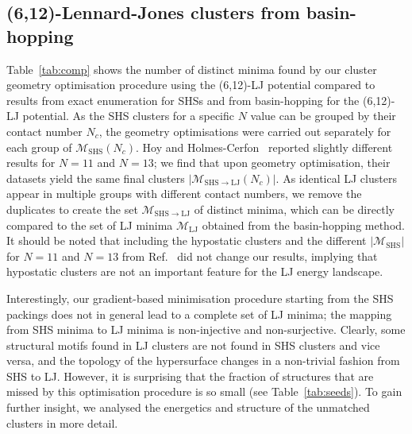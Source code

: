 \subsection{(6,12)-Lennard-Jones clusters from basin-hopping} 

Table~\ref{tab:comp} shows the number of distinct minima found by our cluster
geometry optimisation procedure using the (6,12)-LJ potential compared to
results from exact enumeration for SHSs and from basin-hopping for the (6,12)-LJ
potential.  As the SHS clusters for a specific $N$ value can be grouped by
their contact number $N_c$, the geometry optimisations were carried out
separately for each group of $\mathcal{M}_\mathrm{SHS}(N_c)$. Hoy
\autocite{Hoy_Structurefinitesphere_2012,Hoy_Structuredynamicsmodel_2015} and Holmes-Cerfon~\autocite{Holmes-Cerfon_EnumeratingRigidSphere_2016}  reported
slightly different results
for $N=11$ and $N=13$; we find that upon geometry optimisation,
their datasets yield the same final clusters
$|\mathcal{M}_{\mathrm{SHS\to LJ}}(N_c)|$.  As identical LJ clusters appear in
multiple groups with different contact numbers, we remove the duplicates to
create the set $\mathcal{M}_\mathrm{SHS\to LJ}$ of distinct minima, which can
be directly compared to the set of LJ minima $\mathcal{M}_\mathrm{LJ}$ obtained
from the basin-hopping method. It should be noted that including the hypostatic
clusters and the different $|\mathcal{M}_\mathrm{SHS}|$ for $N=11$ and $N=13$
from Ref.~\autocite{Holmes-Cerfon_EnumeratingRigidSphere_2016} did not change our results, implying that hypostatic
clusters are not an important feature for the LJ energy landscape. 


Interestingly, our gradient-based minimisation procedure starting from the SHS
packings does not in general lead to a complete set of LJ minima; the mapping
from SHS minima to LJ minima is non-injective and non-surjective.  Clearly,
some structural motifs found in LJ clusters are not found in SHS clusters and
vice versa, and the topology of the hypersurface changes in a non-trivial
fashion from SHS to LJ.  However, it is surprising that the fraction of
structures that are missed by this optimisation procedure is so small (see
Table~\ref{tab:seeds}). To gain further insight, we analysed the energetics and
structure of the unmatched clusters in more detail.

